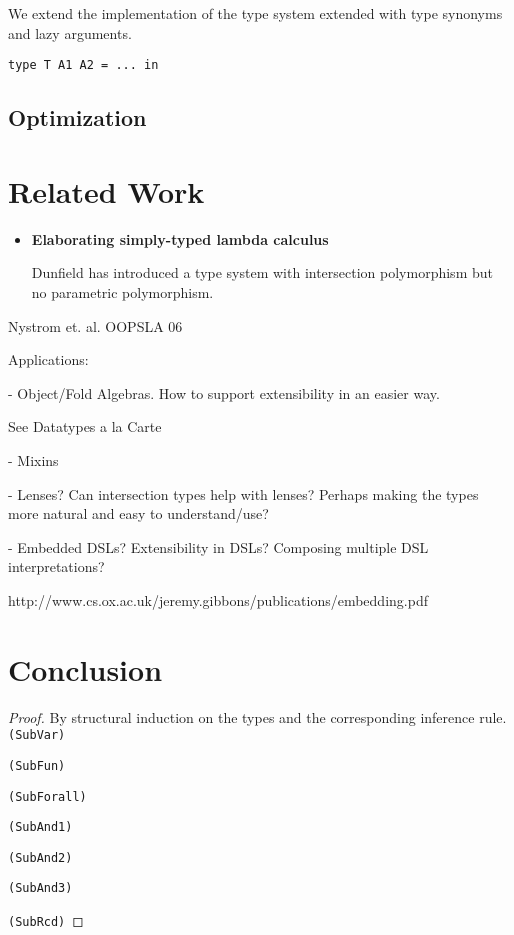 \documentclass[preprint]{sigplanconf}
\begin{document}
We extend the implementation of the type system extended with type synonyms and
lazy arguments.

\begin{lstlisting}
type T A1 A2 = ... in
\end{lstlisting}

\subsection{Optimization}

\section{Related Work}

\begin{itemize}

\item{\bf Elaborating simply-typed lambda calculus}

  Dunfield has introduced a type system with intersection polymorphism but no
  parametric polymorphism.

\end{itemize}

Nystrom et. al. OOPSLA 06

Applications:

- Object/Fold Algebras. How to support extensibility in an easier way.

See Datatypes a la Carte

- Mixins

- Lenses? Can intersection types help with lenses? Perhaps making the
types more natural and easy to understand/use?

- Embedded DSLs? Extensibility in DSLs? Composing multiple DSL interpretations?

http://www.cs.ox.ac.uk/jeremy.gibbons/publications/embedding.pdf

\section{Conclusion}



\begin{proof}
By structural induction on the types and the corresponding inference rule. \\

\texttt{(SubVar)}

\texttt{(SubFun)}

\texttt{(SubForall)}

\texttt{(SubAnd1)}

\texttt{(SubAnd2)}

\texttt{(SubAnd3)}

\texttt{(SubRcd)}

\end{proof}
\end{document}
